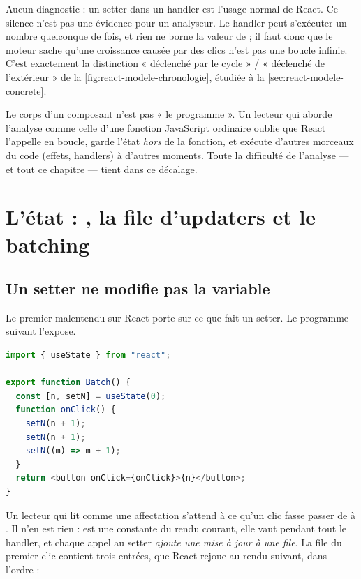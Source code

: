 Aucun diagnostic : un setter dans un handler est l'usage normal de React. Ce
silence n'est pas une évidence pour un analyseur. Le handler peut s'exécuter un
nombre quelconque de fois, et rien ne borne la valeur de  ; il faut
donc que le moteur sache qu'une croissance causée par des clics n'est pas une
boucle infinie. C'est
exactement la distinction « déclenché par le cycle » / « déclenché de
l'extérieur » de la \cref{fig:react-modele-chronologie}, étudiée à la
\cref{sec:react-modele-concrete}.

\begin{piege}
Le corps d'un composant n'est pas « le programme ». Un lecteur qui aborde
l'analyse comme celle d'une fonction JavaScript ordinaire oublie que React
l'appelle en boucle, garde l'état \emph{hors} de la fonction, et exécute d'autres
morceaux du code (effets, handlers) à d'autres moments. Toute la difficulté de
l'analyse --- et tout ce chapitre --- tient dans ce décalage.
\end{piege}

\section{L'état : , la file d'updaters et le batching}
\label{sec:react-modele-usestate}

\subsection{Un setter ne modifie pas la variable}

Le premier malentendu sur React porte sur ce que fait un setter. Le programme
suivant l'expose.

\begin{lstlisting}[language=TypeScript,caption={\code{Batch} : trois appels au setter dans un même handler (\file{/tmp/ch02/batching.tsx})},label={lst:react-modele-batch}]
import { useState } from "react";

export function Batch() {
  const [n, setN] = useState(0);
  function onClick() {
    setN(n + 1);
    setN(n + 1);
    setN((m) => m + 1);
  }
  return <button onClick={onClick}>{n}</button>;
}
\end{lstlisting}

Un lecteur qui lit  comme une affectation s'attend à ce qu'un clic
fasse passer  de  à . Il n'en est rien :  est
une constante du rendu courant, elle vaut  pendant tout le handler, et
chaque appel au setter \emph{ajoute une mise à jour à une file}. La file du
premier clic contient trois entrées, que React rejoue au rendu suivant, dans
l'ordre :

